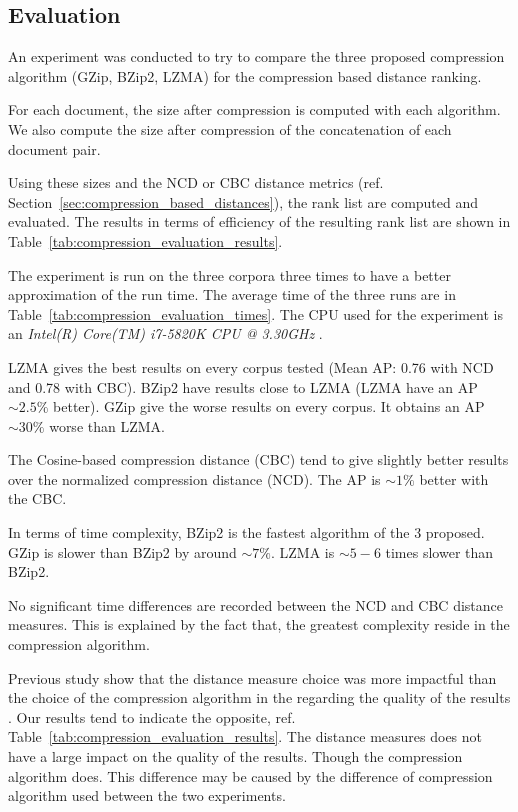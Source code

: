 \subsection{Evaluation}

An experiment was conducted to try to compare the three proposed compression algorithm (GZip, BZip2, LZMA) for the compression based distance ranking.

For each document, the size after compression is computed with each algorithm.
We also compute the size after compression of the concatenation of each document pair.

Using these sizes and the NCD or CBC distance metrics (ref. Section~\ref{sec:compression_based_distances}), the rank list are computed and evaluated.
The results in terms of efficiency of the resulting rank list are shown in Table~\ref{tab:compression_evaluation_results}.

The experiment is run on the three corpora three times to have a better approximation of the run time.
The average time of the three runs are in Table~\ref{tab:compression_evaluation_times}.
The CPU used for the experiment is an \textit{Intel(R) Core(TM) i7-5820K CPU @ 3.30GHz} .

LZMA gives the best results on every corpus tested (Mean AP: 0.76 with NCD and 0.78 with CBC).
BZip2 have results close to LZMA (LZMA have an AP $\sim 2.5\%$ better).
GZip give the worse results on every corpus.
It obtains an AP $\sim 30\%$ worse than LZMA.

The Cosine-based compression distance (CBC) tend to give slightly better results over the normalized compression distance (NCD).
The AP is $\sim 1\%$ better with the CBC.

In terms of time complexity, BZip2 is the fastest algorithm of the 3 proposed.
GZip is slower than BZip2 by around $\sim 7\%$.
LZMA is $\sim 5-6$ times slower than BZip2.

No significant time differences are recorded between the NCD and CBC distance measures.
This is explained by the fact that, the greatest complexity reside in the compression algorithm.

Previous study show that the distance measure choice was more impactful than the choice of the compression algorithm in the regarding the quality of the results \cite{comparing_compression}.
Our results tend to indicate the opposite, ref. Table~\ref{tab:compression_evaluation_results}.
The distance measures does not have a large impact on the quality of the results.
Though the compression algorithm does.
This difference may be caused by the difference of compression algorithm used between the two experiments.

